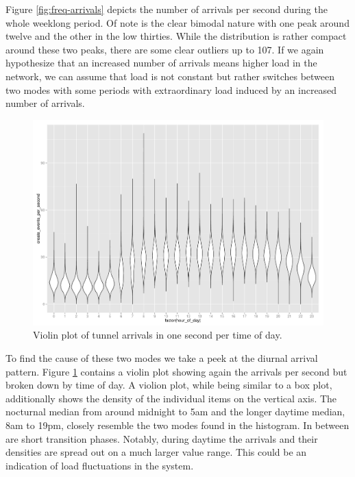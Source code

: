 Figure \ref{fig:freq-arrivals} depicts the number of arrivals per second during the whole weeklong period. Of note is the clear bimodal nature with one peak around twelve and the other in the low thirties. While the distribution is rather compact around these two peaks, there are some clear outliers up to 107.
If we again hypothesize that an increased number of arrivals means higher load in the network, we can assume that load is not constant but rather switches between two modes with some periods with extraordinary load induced by an increased number of arrivals.

\begin{figure}
	\centering
	\includegraphics[width=\columnwidth]{images/IMC2013/R-createspersecond-1h-violin.pdf}
	\caption{Violin plot of tunnel arrivals in one second per time of day.}
	\label{fig:freq-arrivals-per-second-violin}
\end{figure}

To find the cause of these two modes we take a peek at the diurnal arrival pattern. Figure \ref{fig:freq-arrivals-per-second-violin} contains a violin plot showing again the arrivals per second but broken down by time of day. A violion plot, while being similar to a box plot, additionally shows the density of the individual items on the vertical axis.
The nocturnal median from around midnight to 5am and the longer daytime median, 8am to 19pm, closely resemble the two modes found in the histogram. In between are short transition phases. Notably, during daytime the arrivals and their densities are spread out on a much larger value range. This could be an indication of load fluctuations in the system.



